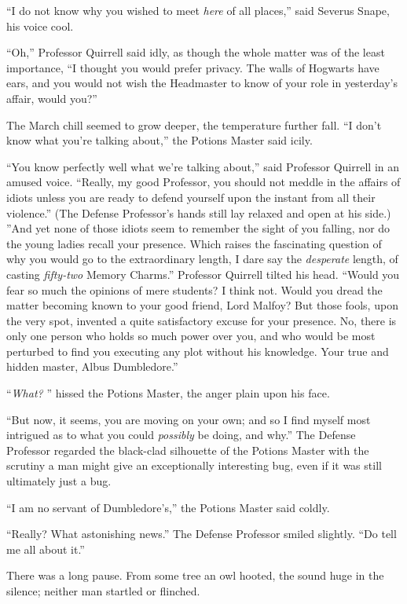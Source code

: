 ``I do not know why you wished to meet \emph{here} of all places,'' said
Severus Snape, his voice cool.

``Oh,'' Professor Quirrell said idly, as though the whole matter was of
the least importance, ``I thought you would prefer privacy. The walls of
Hogwarts have ears, and you would not wish the Headmaster to know of
your role in yesterday's affair, would you?''

The March chill seemed to grow deeper, the temperature further fall. ``I
don't know what you're talking about,'' the Potions Master said icily.

``You know perfectly well what we're talking about,'' said Professor
Quirrell in an amused voice. ``Really, my good Professor, you should not
meddle in the affairs of idiots unless you are ready to defend yourself
upon the instant from all their violence.'' (The Defense Professor's
hands still lay relaxed and open at his side.) ''And yet none of those
idiots seem to remember the sight of you falling, nor do the young
ladies recall your presence. Which raises the fascinating question of
why you would go to the extraordinary length, I dare say the
\emph{desperate} length, of casting \emph{fifty-two} Memory Charms.''
Professor Quirrell tilted his head. ``Would you fear so much the
opinions of mere students? I think not. Would you dread the matter
becoming known to your good friend, Lord Malfoy? But those fools, upon
the very spot, invented a quite satisfactory excuse for your presence.
No, there is only one person who holds so much power over you, and who
would be most perturbed to find you executing any plot without his
knowledge. Your true and hidden master, Albus Dumbledore.''

``\emph{What?} '' hissed the Potions Master, the anger plain upon his
face.

``But now, it seems, you are moving on your own; and so I find myself
most intrigued as to what you could \emph{possibly} be doing, and why.''
The Defense Professor regarded the black-clad silhouette of the Potions
Master with the scrutiny a man might give an exceptionally interesting
bug, even if it was still ultimately just a bug.

``I am no servant of Dumbledore's,'' the Potions Master said coldly.

``Really? What astonishing news.'' The Defense Professor smiled
slightly. ``Do tell me all about it.''

There was a long pause. From some tree an owl hooted, the sound huge in
the silence; neither man startled or flinched.

